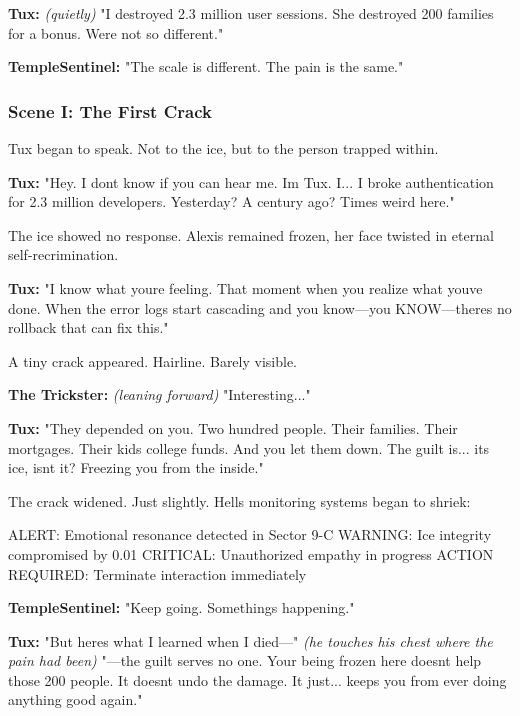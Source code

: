\textbf{Tux:} \emph{(quietly)} "I destroyed 2.3 million user sessions. She destroyed 200 families for a bonus. We\textquotesingle re not so different."

\textbf{TempleSentinel:} "The scale is different. The pain is the same."

\bookdivider

\subsubsection{Scene I: The First Crack}\label{scene-i-the-first-crack}

Tux began to speak. Not to the ice, but to the person trapped within.

\textbf{Tux:} "Hey. I don\textquotesingle t know if you can hear me. I\textquotesingle m Tux. I... I broke authentication for 2.3 million developers. Yesterday? A century ago? Time\textquotesingle s weird here."

The ice showed no response. Alexis remained frozen, her face twisted in eternal self-recrimination.

\textbf{Tux:} "I know what you\textquotesingle re feeling. That moment when you realize what you\textquotesingle ve done. When the error logs start cascading and you know---you KNOW---there\textquotesingle s no rollback that can fix this."

A tiny crack appeared. Hairline. Barely visible.

\textbf{The Trickster:} \emph{(leaning forward)} "Interesting..."

\textbf{Tux:} "They depended on you. Two hundred people. Their families. Their mortgages. Their kids\textquotesingle{} college funds. And you let them down. The guilt is... it\textquotesingle s ice, isn\textquotesingle t it? Freezing you from the inside."

The crack widened. Just slightly. Hell\textquotesingle s monitoring systems began to shriek:

\begin{codeblock}
ALERT: Emotional resonance detected in Sector 9-C
WARNING: Ice integrity compromised by 0.01%
CRITICAL: Unauthorized empathy in progress
ACTION REQUIRED: Terminate interaction immediately
\end{codeblock}

\textbf{TempleSentinel:} "Keep going. Something\textquotesingle s happening."

\textbf{Tux:} "But here\textquotesingle s what I learned when I died---" \emph{(he touches his chest where the pain had been)} "---the guilt serves no one. Your being frozen here doesn\textquotesingle t help those 200 people. It doesn\textquotesingle t undo the damage. It just... keeps you from ever doing anything good again."

